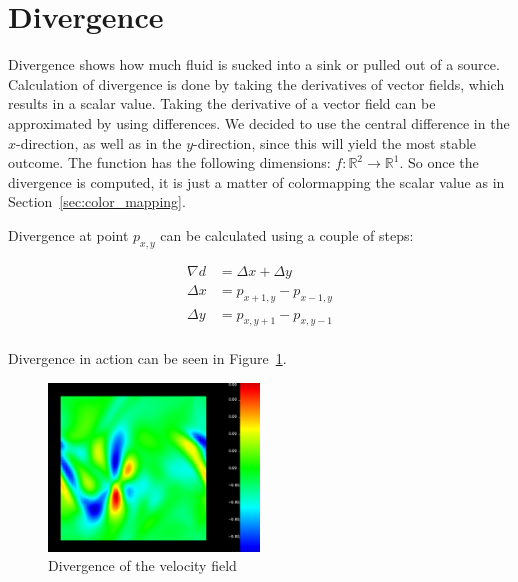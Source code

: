 \section{Divergence}
\label{sec:divergence}
Divergence shows how much fluid is sucked into a sink or pulled out of a source. 
Calculation of divergence is done by taking the derivatives of vector fields, which results in a scalar value.
Taking the derivative of a vector field can be approximated by using differences.
We decided to use the central difference in the $x$-direction, as well as in the $y$-direction, since this will yield the most stable outcome.
The function has the following dimensions:  $f:\mathbb{R}^2 \rightarrow \mathbb{R}^1$.
So once the divergence is computed, it is just a matter of colormapping the scalar value as in Section~\ref{sec:color_mapping}.

Divergence at point $p_{x,y}$ can be calculated using a couple of steps:

\begin{equation*}
\begin{aligned}
\nabla d &= \Delta x + \Delta y \\
\Delta x &= p_{x+1,y} - p_{x-1,y} \\
\Delta y &= p_{x,y+1} - p_{x,y-1} \\
\end{aligned}
\end{equation*}

Divergence in action can be seen in Figure~\ref{fig:div_velo}.
\begin{figure}[htb]
    \centering
    \includegraphics[width =0.5\textwidth]{content/pictures/div_velo.png}
    \caption{Divergence of the velocity field}
    \label{fig:div_velo}
\end{figure}

